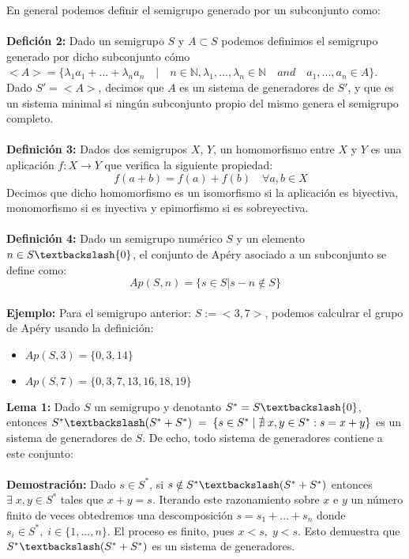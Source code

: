 \documentclass[10pt,spanish]{book}
\begin{document}
En general podemos definir el semigrupo generado por un subconjunto como:\\
\\ \textbf{Defición 2:} Dado un semigrupo $S$ y $A\subset S$ podemos definimos el semigrupo generado por dicho subconjunto cómo $<A>=\{\lambda_{1}a_{1}+...+\lambda_{n}a_{n}\quad |\quad n\in\mathbb{N}, \lambda_{1},...,\lambda_{n}\in\mathbb{N}\quad and\quad a_{1},...,a_{n}\in A\}$. Dado $S'=<A>$, decimos que $A$ es un sistema de generadores de $S'$, y que es un sistema minimal si ningún subconjunto propio del mismo genera el semigrupo completo. \\
\\ \textbf{Definición 3:} Dados dos semigrupos $X$, $Y$, un homomorfismo entre $X$ y $Y$ es una aplicación $f:X\rightarrow Y$ que verifica la siguiente propiedad:\\
$$\quad f(a+b)=f(a)+f(b)\quad \forall a, b\in X$$ 
Decimos que dicho homomorfismo es un isomorfismo si la aplicación es biyectiva, monomorfismo si es inyectiva y epimorfismo si es sobreyectiva.\\
\\ \textbf{Definición 4:} Dado un semigrupo numérico $S$ y un elemento $n\in S\textbackslash\{0\}$, el conjunto de Apéry asociado a un subconjunto se define como:
$$ Ap(S,n) = \{s\in S | s-n\notin S\} $$\\
\textbf{Ejemplo: } Para el semigrupo anterior: $S:=<{3,7}>$, podemos calculrar el grupo de Apéry usando la definición:
\begin{itemize}
\item $Ap(S,3)=\{0,3,14\}$
\item $Ap(S,7)=\{0,3,7,13,16,18,19\}$
\end{itemize}
\textbf{Lema 1: } Dado $S$ un semigrupo y denotanto $S^{*}=S\textbackslash \{0\}$, entonces $S^{*}\textbackslash (S^{*}+S^{*}) \;=\; \{s\in S^{*} \; |\; \nexists\; x,y\in S^{*} : s=x+y\}$ es un sistema de generadores de $S$. De echo, todo sistema de generadores contiene a este conjunto:\\
\\ \textbf{Demostración:} Dado $s\in S^{*}$, si $s\notin S^{*}\textbackslash (S^{*}+S^{*})$ entonces $\exists \; x,y\in S^{*}$ tales que $x+y=s$. Iterando este razonamiento sobre $x$ e $y$ un número finito de veces obtedremos una descomposición $s=s_{1}+...+s_{n}$ donde $s_{i}\in S^{*},\; i\in \{1,...,n\}$. El proceso es finito, pues $x<s,\; y<s$. Esto demuestra que $S^{*}\textbackslash (S^{*}+S^{*})$ es un sistema de generadores.\\
\end{document}
